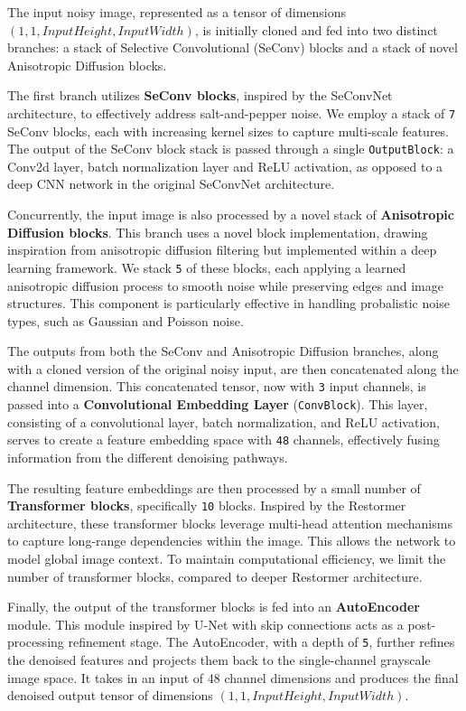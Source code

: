 The input noisy image, represented as a tensor of dimensions \( (1, 1, InputHeight, InputWidth) \), is initially cloned and fed into two distinct branches: a stack of Selective Convolutional (SeConv) blocks and a stack of novel Anisotropic Diffusion blocks.

The first branch utilizes \textbf{SeConv blocks}, inspired by the SeConvNet architecture\cite{Rafiee2021}, to effectively address salt-and-pepper noise. We employ a stack of \texttt{7} SeConv blocks, each with increasing kernel sizes to capture multi-scale features. The output of the SeConv block stack is passed through a single \texttt{OutputBlock}: a Conv2d layer, batch normalization layer and ReLU activation, as opposed to a deep CNN network  in the original SeConvNet architecture.

Concurrently, the input image is also processed by a novel stack of \textbf{Anisotropic Diffusion blocks}. This branch uses a novel block implementation, drawing inspiration from anisotropic diffusion filtering but implemented within a deep learning framework. We stack \texttt{5} of these blocks, each applying a learned anisotropic diffusion process to smooth noise while preserving edges and image structures. This component is particularly effective in handling probalistic noise types, such as Gaussian and Poisson noise.

The outputs from both the SeConv and Anisotropic Diffusion branches, along with a cloned version of the original noisy input, are then concatenated along the channel dimension. This concatenated tensor, now with \texttt{3} input channels, is passed into a \textbf{Convolutional Embedding Layer} (\texttt{ConvBlock}). This layer, consisting of a convolutional layer, batch normalization, and ReLU activation, serves to create a feature embedding space with \texttt{48} channels, effectively fusing information from the different denoising pathways.

The resulting feature embeddings are then processed by a small number of \textbf{Transformer blocks}, specifically \texttt{10} blocks. Inspired by the Restormer architecture\cite{Zamir2022}, these transformer blocks leverage multi-head attention mechanisms to capture long-range dependencies within the image. This allows the network to model global image context. To maintain computational efficiency, we limit the number of transformer blocks, compared to deeper Restormer architecture.

Finally, the output of the transformer blocks is fed into an \textbf{AutoEncoder} module. This module inspired by U-Net with skip connections\cite{Wu2022} acts as a post-processing refinement stage. The AutoEncoder, with a depth of \texttt{5}, further refines the denoised features and projects them back to the single-channel grayscale image space. It takes in an input of 48 channel dimensions and produces the final denoised output tensor of dimensions \( (1, 1, InputHeight, InputWidth) \).

